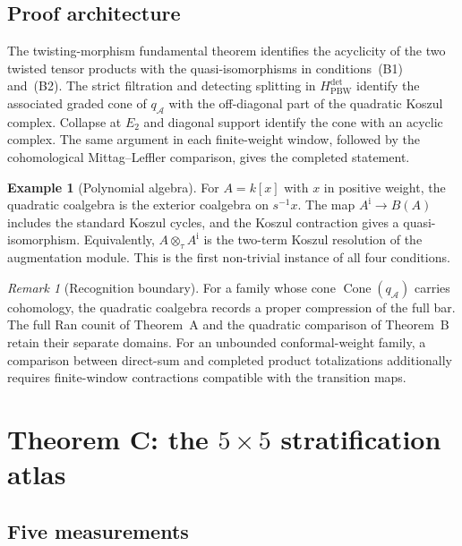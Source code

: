 \documentclass[11pt]{article}
\theoremstyle{plain}
\theoremstyle{definition}
\newtheorem{example}[theorem]{Example}
\theoremstyle{remark}
\newtheorem{remark}[theorem]{Remark}
\newcommand{\cA}{\mathcal{A}}
\begin{document}
\subsection{Proof architecture}

The twisting-morphism fundamental theorem identifies the acyclicity
of the two twisted tensor products with the quasi-isomorphisms in
conditions~\textup{(B1)} and~\textup{(B2)}.  The strict filtration
and detecting splitting in $H_{\mathrm{PBW}}^{\mathrm{det}}$ identify
the associated graded cone of $q_\cA$ with the off-diagonal part of
the quadratic Koszul complex.  Collapse at $E_2$ and diagonal support
identify the cone with an acyclic complex.  The same argument in each finite-weight
window, followed by the cohomological Mittag--Leffler comparison,
gives the completed statement.

\begin{example}[Polynomial algebra]\label{ex:thmB-heis}
For $A=k[x]$ with $x$ in positive weight, the quadratic coalgebra is
the exterior coalgebra on $s^{-1}x$.  The map
$A^{\mathrm i}\to B(A)$ includes the standard Koszul cycles, and the
Koszul contraction gives a quasi-isomorphism.  Equivalently,
$A\otimes_\tau A^{\mathrm i}$ is the two-term Koszul resolution of
the augmentation module.  This is the first non-trivial instance of
all four conditions.
\end{example}

\begin{remark}[Recognition boundary]\label{rem:off-koszul}
For a family whose cone $\operatorname{Cone}(q_\cA)$ carries
cohomology, the quadratic coalgebra records a proper compression of
the full bar.  The full Ran counit of Theorem~A and the quadratic
comparison of Theorem~B retain their separate domains.  For an
unbounded conformal-weight family, a comparison between direct-sum
and completed product totalizations additionally requires
finite-window contractions compatible with the transition maps.
\end{remark}



\section{Theorem C: the \(5\times5\) stratification atlas}
\label{sec:theorem-C}

\subsection{Five measurements}
\end{document}
